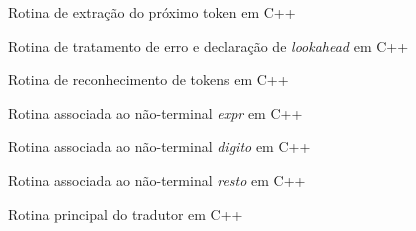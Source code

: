 \begin{frame}[fragile]{Rotina de extração do próximo token em C++}


\end{frame}

\begin{frame}[fragile]{Rotina de tratamento de erro e declaração de {\it lookahead} em C++}


\end{frame}

\begin{frame}[fragile]{Rotina de reconhecimento de tokens em C++}


\end{frame}

\begin{frame}[fragile]{Rotina associada ao não-terminal {\it expr} em C++}


\end{frame}

\begin{frame}[fragile]{Rotina associada ao não-terminal {\it digito} em C++}


\end{frame}

\begin{frame}[fragile]{Rotina associada ao não-terminal {\it resto} em C++}


\end{frame}

\begin{frame}[fragile]{Rotina principal do tradutor em C++}


\end{frame}
